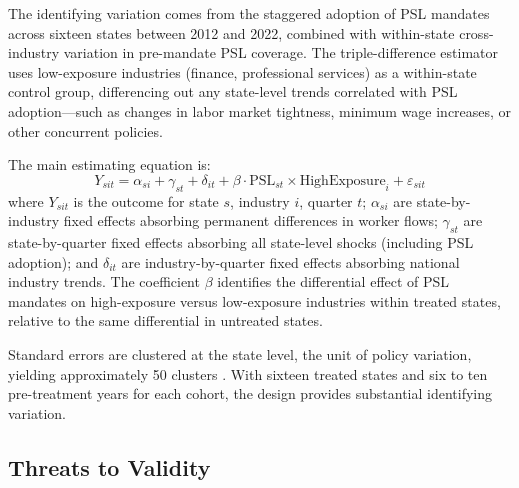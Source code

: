 \documentclass[12pt]{article}
\begin{document}
The identifying variation comes from the staggered adoption of PSL mandates across sixteen states between 2012 and 2022, combined with within-state cross-industry variation in pre-mandate PSL coverage. The triple-difference estimator uses low-exposure industries (finance, professional services) as a within-state control group, differencing out any state-level trends correlated with PSL adoption---such as changes in labor market tightness, minimum wage increases, or other concurrent policies.

The main estimating equation is:
\begin{equation}
Y_{sit} = \alpha_{si} + \gamma_{st} + \delta_{it} + \beta \cdot \text{PSL}_{st} \times \text{HighExposure}_{i} + \varepsilon_{sit}
\label{eq:ddd}
\end{equation}
where $Y_{sit}$ is the outcome for state $s$, industry $i$, quarter $t$; $\alpha_{si}$ are state-by-industry fixed effects absorbing permanent differences in worker flows; $\gamma_{st}$ are state-by-quarter fixed effects absorbing all state-level shocks (including PSL adoption); and $\delta_{it}$ are industry-by-quarter fixed effects absorbing national industry trends. The coefficient $\beta$ identifies the differential effect of PSL mandates on high-exposure versus low-exposure industries within treated states, relative to the same differential in untreated states.

Standard errors are clustered at the state level, the unit of policy variation, yielding approximately 50 clusters \citep{cameron2008}. With sixteen treated states and six to ten pre-treatment years for each cohort, the design provides substantial identifying variation.

\subsection{Threats to Validity}
\end{document}
